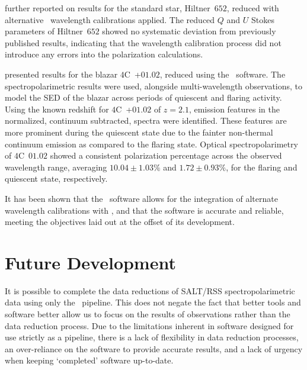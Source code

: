 \citet{Cooper_HEASA2022} further reported on results for the standard star, Hiltner~$652$, reduced with alternative \iraf\ wavelength calibrations applied.
The reduced $Q$ and $U$ Stokes parameters of Hiltner~$652$ showed no systematic deviation from previously published results, indicating that the wavelength calibration process did not introduce any errors into the polarization calculations.

\citet{Schutte4C0102} presented results for the blazar $4$C~+$01.02$, reduced using the \stops\ software.
The spectropolarimetric results were used, alongside multi-wavelength observations, to model the \gls{SED} of the blazar across periods of quiescent and flaring activity.
Using the known redshift for $4$C~+$01.02$ of $z = 2.1$, emission features in the normalized, continuum subtracted, spectra were identified.
These features are more prominent during the quiescent state due to the fainter non-thermal continuum emission as compared to the flaring state.
Optical spectropolarimetry of $4$C~$01.02$ showed a consistent polarization percentage across the observed wavelength range, averaging $10.04 \pm 1.03 \%$ and $1.72 \pm 0.93 \%$, for the flaring and quiescent state, respectively.

It has been shown that the \stops\ software allows for the integration of alternate wavelength calibrations with \polsalt, and that the software is accurate and reliable, meeting the objectives laid out at the offset of its development.

\section{Future Development} \label{sec:future}

It is possible to complete the data reductions of \gls{SALT}/\gls{RSS} spectropolarimetric data using only the \polsalt\ pipeline.
This does not negate the fact that better tools and software better allow us to focus on the results of observations rather than the data reduction process.
Due to the limitations inherent in software designed for use strictly as a pipeline, there is a lack of flexibility in data reduction processes, an over-reliance on the software to provide accurate results, and a lack of urgency when keeping `completed' software up-to-date.

